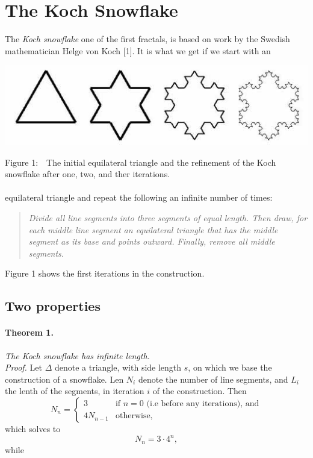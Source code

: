 \documentclass[a4paper]{article}
\begin{document}
\section{The Koch Snowflake}
The \emph{Koch snowflake} one of the first fractals, is based on work by the
Swedish mathematician Helge von Koch [1]. It is what we get if we
start with an 
\begin{center}
	\includegraphics[scale=0.4]{snowflake.jpg}
\end{center}
Figure 1:$\quad$The initial equilateral triangle and the refinement of the Koch
snowflake after one, two, and ther iterations.\\
\\
equilateral triangle and repeat the following an infinite number of times:

\begin{quote}
\emph{Divide all line segments into three segments of equal length. Then draw,
	for each middle line segment an equilateral triangle that has the middle
	segment as its base and points outward. Finally, remove all middle segments.
	}
\end{quote}
Figure 1 shows the first iterations in the construction. 


\subsection{Two properties}
\paragraph{Theorem 1.} \emph{The Koch snowflake has infinite length.}\\
\emph{Proof.} Let $\Delta$ denote a triangle, with side length $s$, on which
we base the construction of a snowflake. Len $N_i$ denote the number of line
segments, and $L_i$ the lenth of the segments, in iteration $i$ of the 
construction. Then
$$
	N_n = 
	\begin{cases}
		3 &\text{if } n = 0 \text{ (i.e before any iterations), and} \\
		4N_{n-1} &\text{otherwise,}
	\end{cases}
$$
which solves to
\begin{equation}
	N_n = 3 \cdot 4^n,
\end{equation}
while
\newcommand{\uberfrac}[1]{
	= \frac {L_{n - #1}} {3^#1}
}
\end{document}
